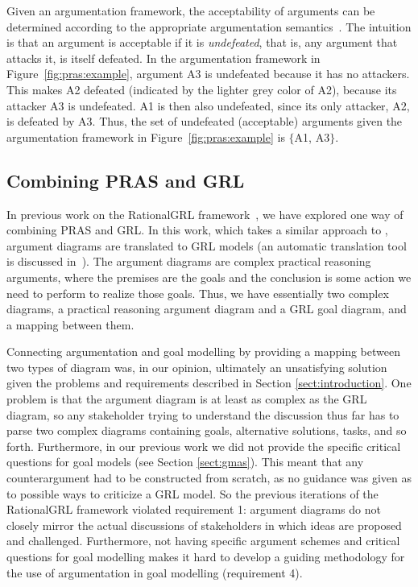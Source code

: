 Given an argumentation framework, the acceptability of arguments can be determined according to the appropriate argumentation semantics~\cite{Dung1995}. The intuition is that an argument is acceptable if it is \emph{undefeated}, that is, any argument that attacks it, is itself defeated. In the argumentation framework in Figure~\ref{fig:pras:example}, argument A3 is undefeated because it has no attackers. This makes A2 defeated (indicated by the lighter grey color of A2), because its attacker A3 is undefeated. A1 is then also undefeated, since its only attacker, A2, is defeated by A3. Thus, the set of undefeated (acceptable) arguments given the argumentation framework in Figure~\ref{fig:pras:example} is $\{$A1, A3$\}$.


\subsection{Combining PRAS and GRL}
\label{sect:background:pras:motivation}


In previous work on the RationalGRL framework~\cite{vanzee-etal:renext2015,vanZee-etal:er2016}, we have explored one way of combining PRAS and GRL. In this work, which takes a similar approach to \cite{Jureta:RE2008}, argument diagrams are translated to GRL models (an automatic translation tool is discussed in~\cite{vanZee-etal:comma2016}). The argument diagrams are complex practical reasoning arguments, where the premises are the goals and the conclusion is some action we need to perform to realize those goals. Thus, we have essentially two complex diagrams, a practical reasoning argument diagram and a GRL goal diagram, and a mapping between them. 

Connecting argumentation and goal modelling by providing a mapping between two types of diagram was, in our opinion, ultimately an unsatisfying solution given the problems and requirements described in Section \ref{sect:introduction}. One problem is that the argument diagram is at least as complex as the GRL diagram, so any stakeholder trying to understand the discussion thus far has to parse two complex diagrams containing goals, alternative solutions, tasks, and so forth. Furthermore, in our previous work we did not provide the specific critical questions for goal models (see Section \ref{sect:gmas}). This meant that any counterargument had to be constructed from scratch, as no guidance was given as to possible ways to criticize a GRL model. So the previous iterations of the RationalGRL framework violated requirement 1: argument diagrams do not closely mirror the actual discussions of stakeholders in which ideas are proposed and challenged. Furthermore, not having specific argument schemes and critical questions for goal modelling makes it hard to develop a guiding methodology for the use of argumentation in goal modelling (requirement 4). 

